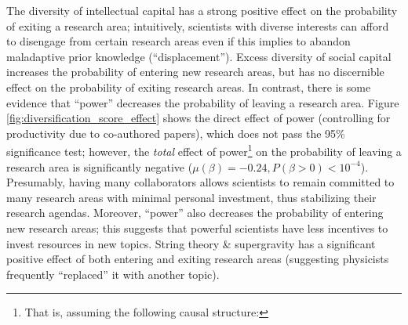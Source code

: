 \documentclass{article}
\begin{document}
The diversity of intellectual capital has a strong positive effect on the probability of exiting a research area; intuitively, scientists with diverse interests can afford to disengage from certain research areas even if this implies to abandon maladaptive prior knowledge (``displacement''). Excess diversity of social capital increases the probability of entering new research areas, but has no discernible effect on the probability of exiting research areas. In contrast, there is some evidence that ``power'' decreases the probability of leaving a research area. Figure \ref{fig:diversification_score_effect} shows the direct effect of power (controlling for productivity due to co-authored papers), which does not pass the 95\% significance test; however, the \textit{total} effect of power\footnote{That is, assuming the following causal structure:

\centering
{}} on the probability of leaving a research area is significantly negative ($\mu(\beta)=-0.24, P(\beta>0)<10^{-4}$). Presumably, having many collaborators allows scientists to remain committed to many research areas with minimal personal investment, thus stabilizing their research agendas. Moreover, ``power'' also decreases the probability of entering new research areas; this suggests that powerful scientists have less incentives to invest resources in new topics. String theory \& supergravity has a significant positive effect of both entering and exiting research areas (suggesting physicists frequently ``replaced'' it with another topic). %
\end{document}
